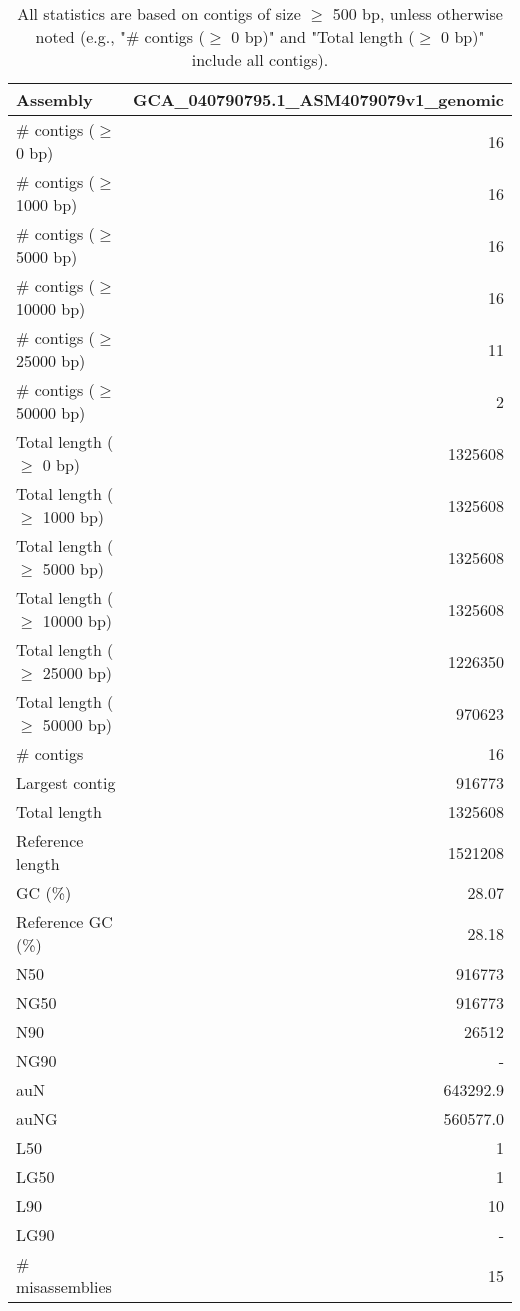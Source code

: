 \documentclass[12pt,a4paper]{article}
\begin{document}
\begin{table}[ht]
\begin{center}
\caption{All statistics are based on contigs of size $\geq$ 500 bp, unless otherwise noted (e.g., "\# contigs ($\geq$ 0 bp)" and "Total length ($\geq$ 0 bp)" include all contigs).}
\begin{tabular}{|l*{1}{|r}|}
\hline
Assembly & GCA\_040790795.1\_ASM4079079v1\_genomic \\ \hline
\# contigs ($\geq$ 0 bp) & 16 \\ \hline
\# contigs ($\geq$ 1000 bp) & 16 \\ \hline
\# contigs ($\geq$ 5000 bp) & 16 \\ \hline
\# contigs ($\geq$ 10000 bp) & 16 \\ \hline
\# contigs ($\geq$ 25000 bp) & 11 \\ \hline
\# contigs ($\geq$ 50000 bp) & 2 \\ \hline
Total length ($\geq$ 0 bp) & 1325608 \\ \hline
Total length ($\geq$ 1000 bp) & 1325608 \\ \hline
Total length ($\geq$ 5000 bp) & 1325608 \\ \hline
Total length ($\geq$ 10000 bp) & 1325608 \\ \hline
Total length ($\geq$ 25000 bp) & 1226350 \\ \hline
Total length ($\geq$ 50000 bp) & 970623 \\ \hline
\# contigs & 16 \\ \hline
Largest contig & 916773 \\ \hline
Total length & 1325608 \\ \hline
Reference length & 1521208 \\ \hline
GC (\%) & 28.07 \\ \hline
Reference GC (\%) & 28.18 \\ \hline
N50 & 916773 \\ \hline
NG50 & 916773 \\ \hline
N90 & 26512 \\ \hline
NG90 & - \\ \hline
auN & 643292.9 \\ \hline
auNG & 560577.0 \\ \hline
L50 & 1 \\ \hline
LG50 & 1 \\ \hline
L90 & 10 \\ \hline
LG90 & - \\ \hline
\# misassemblies & 15 \\ \hline

\end{tabular}
\end{center}
\end{table}
\end{document}
